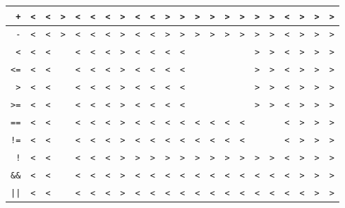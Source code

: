 \documentclass[11pt,a4paper]{article}
\newcommand*\id[1]{\texttt{#1}}
\begin{document}
\begin{table}[H]
\begin{tabular}{|r||c|c|c|c|c|c|c|c|c|c|c|c|c|c|c|c|c|c|c|c|c|}
      \id{+}   & \id{<}  & \id{<}   & \id{>} & \id{<}  & \id{<}  & \id{<} & \id{>} & \id{<} & \id{<} & \id{>} & \id{>} & \id{>} & \id{>}  & \id{>} & \id{>}  & \id{>}  & \id{>}  & \id{<} & \id{>} & \id{>} & \id{>}  \\ \hline
      \id{-}   & \id{<}  & \id{<}   & \id{>} & \id{<}  & \id{<}  & \id{<} & \id{>} & \id{<} & \id{<} & \id{>} & \id{>} & \id{>} & \id{>}  & \id{>} & \id{>}  & \id{>}  & \id{>}  & \id{<} & \id{>} & \id{>} & \id{>}  \\ \hline

      \id{<}   & \id{<}  & \id{<}   & \id{ } & \id{<}  & \id{<}  & \id{<} & \id{>} & \id{<} & \id{<} & \id{<} & \id{<} & \id{ } & \id{ }  & \id{ } & \id{ }  & \id{>}  & \id{>}  & \id{<} & \id{>} & \id{>} & \id{>}  \\ \hline
      \id{<=}  & \id{<}  & \id{<}   & \id{ } & \id{<}  & \id{<}  & \id{<} & \id{>} & \id{<} & \id{<} & \id{<} & \id{<} & \id{ } & \id{ }  & \id{ } & \id{ }  & \id{>}  & \id{>}  & \id{<} & \id{>} & \id{>} & \id{>}  \\ \hline
      \id{>}   & \id{<}  & \id{<}   & \id{ } & \id{<}  & \id{<}  & \id{<} & \id{>} & \id{<} & \id{<} & \id{<} & \id{<} & \id{ } & \id{ }  & \id{ } & \id{ }  & \id{>}  & \id{>}  & \id{<} & \id{>} & \id{>} & \id{>}  \\ \hline
      \id{>=}  & \id{<}  & \id{<}   & \id{ } & \id{<}  & \id{<}  & \id{<} & \id{>} & \id{<} & \id{<} & \id{<} & \id{<} & \id{ } & \id{ }  & \id{ } & \id{ }  & \id{>}  & \id{>}  & \id{<} & \id{>} & \id{>} & \id{>}  \\ \hline

      \id{==}  & \id{<}  & \id{<}   & \id{ } & \id{<}  & \id{<}  & \id{<} & \id{>} & \id{<} & \id{<} & \id{<} & \id{<} & \id{<} & \id{<}  & \id{<} & \id{<}  & \id{ }  & \id{ }  & \id{<} & \id{>} & \id{>} & \id{>}  \\ \hline
      \id{!=}  & \id{<}  & \id{<}   & \id{ } & \id{<}  & \id{<}  & \id{<} & \id{>} & \id{<} & \id{<} & \id{<} & \id{<} & \id{<} & \id{<}  & \id{<} & \id{<}  & \id{ }  & \id{ }  & \id{<} & \id{>} & \id{>} & \id{>}  \\ \hline
      
      \id{!}   & \id{<}  & \id{<}   & \id{ } & \id{<}  & \id{<}  & \id{<} & \id{>} & \id{>} & \id{>} & \id{>} & \id{>} & \id{>} & \id{>}  & \id{>} & \id{>}  & \id{>}  & \id{>}  & \id{<} & \id{>} & \id{>} & \id{>}  \\ \hline
      \id{\&\&} & \id{<}  & \id{<}   & \id{ } & \id{<}  & \id{<}  & \id{<} & \id{>} & \id{<} & \id{<} & \id{<} & \id{<} & \id{<} & \id{<}  & \id{<} & \id{<}  & \id{<}  & \id{<}  & \id{<} & \id{>} & \id{>} & \id{>}  \\ \hline
      \id{||}  & \id{<}  & \id{<}   & \id{ } & \id{<}  & \id{<}  & \id{<} & \id{>} & \id{<} & \id{<} & \id{<} & \id{<} & \id{<} & \id{<}  & \id{<} & \id{<}  & \id{<}  & \id{<}  & \id{<} & \id{<} & \id{>} & \id{>}  \\ \hline
      

\end{tabular}
\end{table}
\end{document}
